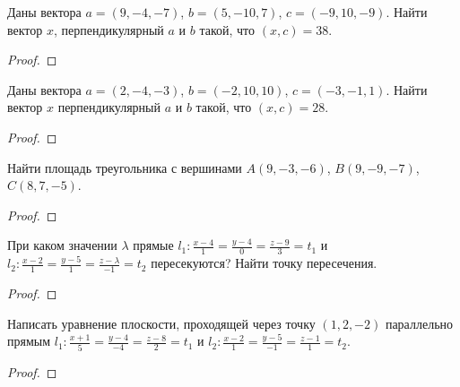 
\renewcommand*{\proofname}{Решение}

\begin{problem}
    Даны вектора $a = (9, -4, -7)$, $b = (5, -10, 7)$, $c = (-9, 10, -9)$. Найти вектор $x$, перпендикулярный $a$ и $b$ такой, что $(x, c) = 38$.
\end{problem}

\begin{proof}\end{proof}

\begin{problem}
    Даны вектора $a = (2, -4, -3)$, $b = (-2, 10, 10)$, $c = (-3, -1, 1)$. Найти вектор $x$ перпендикулярный $a$ и $b$ такой, что $(x, c) = 28$.
\end{problem}

\begin{proof}\end{proof}

\begin{problem}
    Найти площадь треугольника с вершинами $A(9, -3, -6)$, $B(9, -9, -7)$, $C(8, 7, -5)$.
\end{problem}

\begin{proof}\end{proof}

\begin{problem}
    При каком значении $\lambda$ прямые $l_1: \frac{x-4}{1} = \frac{y-4}{0} = \frac{z-9}{3} = t_1$ и $l_2: \frac{x-2}{1} = \frac{y-5}{1} = \frac{z-\lambda}{-1} = t_2$ пересекуются? Найти точку пересечения.
\end{problem}

\begin{proof}\end{proof}

\begin{problem}
    Написать уравнение плоскости, проходящей через точку $(1, 2, -2)$ параллельно прямым $l_1: \frac{x+1}{5} = \frac{y-4}{-4} = \frac{z-8}{2} = t_1$ и $l_2: \frac{x-2}{1} = \frac{y-5}{-1} = \frac{z-1}{1} = t_2$.
\end{problem}

\begin{proof}\end{proof}

